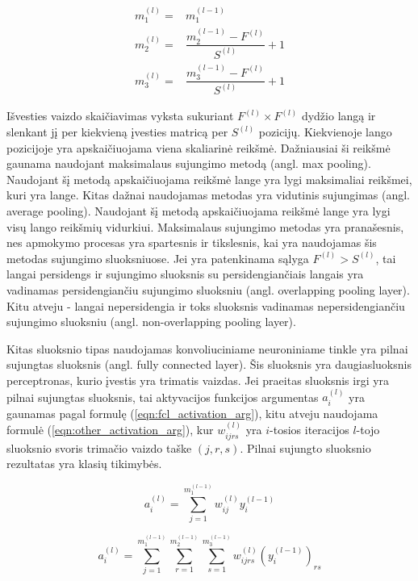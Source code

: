 \begin{equation}
\label{eqn:pool_layer_dims}
	\begin{split}
		m_1^{(l)} = & m_1^{(l-1)} \\
		m_2^{(l)} = & \dfrac{m_2^{(l-1)} - F^{(l)}}{S^{(l)}} + 1 \\
		m_3^{(l)} = & \dfrac{m_3^{(l-1)} - F^{(l)}}{S^{(l)}} + 1
	\end{split}
\end{equation}

Išvesties vaizdo skaičiavimas vyksta sukuriant $ F^{(l)} \times  F^{(l)}$ dydžio langą ir slenkant jį per kiekvieną įvesties matricą per $S^{(l)}$ pozicijų. Kiekvienoje lango pozicijoje yra apskaičiuojama viena skaliarinė reikšmė. Dažniausiai ši reikšmė gaunama naudojant maksimalaus sujungimo metodą (angl. max pooling). Naudojant šį metodą apskaičiuojama reikšmė lange yra lygi maksimaliai reikšmei, kuri yra lange. Kitas dažnai naudojamas metodas yra vidutinis sujungimas (angl. average pooling). Naudojant šį metodą apskaičiuojama reikšmė lange yra lygi visų lango reikšmių vidurkiui. Maksimalaus sujungimo metodas yra pranašesnis, nes apmokymo procesas yra spartesnis ir tikslesnis, kai yra naudojamas šis metodas sujungimo sluoksniuose. Jei yra patenkinama sąlyga $F^{(l)} > S^{(l)}$, tai langai persidengs ir sujungimo sluoksnis su persidengiančiais langais yra vadinamas persidengiančiu sujungimo sluoksniu (angl. overlapping pooling layer). Kitu atveju - langai nepersidengia ir toks sluoksnis vadinamas nepersidengiančiu sujungimo sluoksniu (angl. non-overlapping pooling layer).

Kitas sluoksnio tipas naudojamas konvoliuciniame neuroniniame tinkle yra pilnai sujungtas sluoksnis (angl. fully connected layer). Šis sluoksnis yra daugiasluoksnis perceptronas, kurio įvestis yra trimatis vaizdas. Jei praeitas sluoksnis irgi yra pilnai sujungtas sluoksnis, tai aktyvacijos funkcijos argumentas $a_i^{(l)}$ yra gaunamas pagal formulę (\ref{eqn:fcl_activation_arg}), kitu atveju naudojama formulė (\ref{eqn:other_activation_arg}), kur $ w_{ijrs}^{(l)}$ yra $i$-tosios iteracijos $l$-tojo sluoksnio svoris trimačio vaizdo taške $(j,r,s)$. Pilnai sujungto sluoksnio rezultatas yra klasių tikimybės.


\begin{equation}
\label{eqn:fcl_activation_arg}
	a_i^{(l)} = \sum_{j = 1}^{m_1^{(l-1)}} w_{ij}^{(l)}y_i^{(l-1)}
\end{equation}

\begin{equation}
\label{eqn:other_activation_arg}
	a_i^{(l)} = \sum_{j = 1}^{m_1^{(l-1)}} \sum_{r = 1}^{m_2^{(l-1)}} \sum_{s = 1}^{m_3^{(l-1)}} w_{ijrs}^{(l)} (y_i^{(l-1)})_{rs}
\end{equation}

